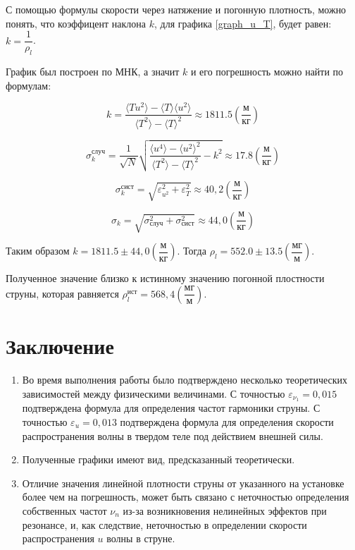 \documentclass[
a4paper, %
12pt, %
]{article}
\begin{document}
	С помощью формулы скорости через натяжение и погонную плотность, можно понять, что коэффицент наклона $k$, для графика \ref{graph_u_T}, будет равен: $k = \dfrac{1}{\rho_l}$.
	
	График был построен по МНК, а значит $k$ и его погрешность можно найти по формулам:
	
	\begin{equation}
		k=\frac{\langle Tu^2\rangle-\langle T\rangle \langle u^2\rangle}{\langle T^2\rangle - \langle T\rangle^2} \approx 1811.5 \left(\dfrac{\text{м}}{\text{кг}}\right)
	\end{equation}
	
	\begin{equation}
		\sigma_k^\text{случ}=\frac{1}{\sqrt{N}}\sqrt{\frac{\langle u^4 \rangle - \langle u^2 \rangle^2}{\langle T^2 \rangle - \langle T \rangle^2} - k^2  } \approx 17.8 \left(\dfrac{\text{м}}{\text{кг}}\right)
	\end{equation}
	
	\begin{equation}
		\sigma_k^{\text{сист}} = \sqrt{ \varepsilon_{u^2}^2 + \varepsilon_T^2 } \approx 40,2 \left(\dfrac{\text{м}}{\text{кг}}\right)
	\end{equation}
	
	\begin{equation}
		\sigma_k = \sqrt{\sigma_\text{случ}^2 + \sigma_\text{сист}^2} \approx 44,0 \left(\dfrac{\text{м}}{\text{кг}}\right)
	\end{equation}
	
	Таким образом $k = 1811.5 \pm 44,0 \left({ \dfrac{\text{м}}{\text{кг}}}\right) $.
	Тогда $\rho_l = 552.0 \pm 13.5 \left({ \dfrac{\text{мг}}{\text{м}}}\right)$.
	
	Полученное значение близко к истинному значению погонной плостности струны, которая равняется $\rho^{\text{ист}}_l = 568,4\left({ \dfrac{\text{мг}}{\text{м}}}\right) $. 
	
	\newpage
	
	\section{Заключение}
	\begin{enumerate}
		\item
		Во время выполнения работы было подтверждено несколько теоретических зависимостей между физическими величинами. С точностью $\varepsilon_{\nu_{1}} = 0,015$ подтверждена формула для определения частот гармоники струны. С точностью  $\varepsilon_{u} = 0,013$ подтверждена формула для определения скорости распространения волны в твердом теле под действием внешней силы.
		\item
		Полученные графики имеют вид, предсказанный теоретически.
		\item
		Отличие значения линейной плотности струны от указанного на установке более чем на погрешность, может быть связано с неточностью определения собственных частот $\nu_n$ из-за возникновения нелинейных эффектов при резонансе, и, как следствие, неточностью в определении скорости распространения $u$ волны в струне.
	\end{enumerate}
	
	
\end{document}

